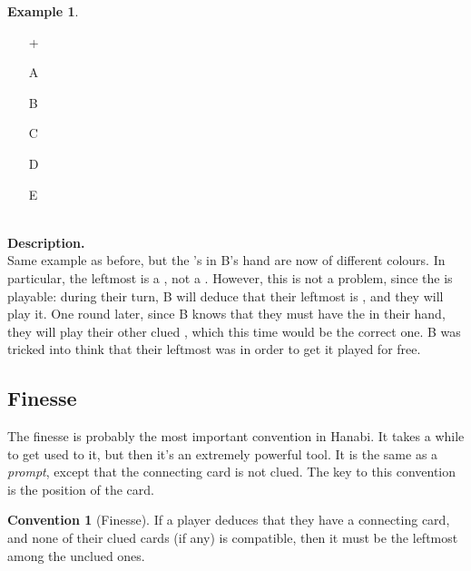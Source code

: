 \documentclass[a4paper]{article}
\theoremstyle{plain}
\theoremstyle{definition}
\newtheorem{example}[theorem]{Example}
\newtheorem{convention}[theorem]{Convention}
\begin{document}
\begin{example} \hfill \\
	\begin{minipage}{0.45\textwidth}
		\begin{itemize}
			\item[\Large +]      
			\item[\Large A]    
			\item[\Large B]    
			\item[\Large C]    
			\item[\Large D]    
			\item[\Large E]    
		\end{itemize}
	\end{minipage}%
	\begin{minipage}{0.55\textwidth}
		\hfill \\
		
		\textbf{Description.} \\
		
		Same example as before, but the 's in B's hand are now of different colours. In particular, the leftmost is a , not a . However, this is not a problem, since the  is playable: during their turn, B will deduce that their leftmost  is , and they will play it. One round later, since B knows that they must have the  in their hand, they will play their other clued , which this time would be the correct one. B was tricked into think that their leftmost  was  in order to get it played for free.
	\end{minipage}
\end{example} \vspace{0.15 cm}

\subsection{Finesse}
\label{sec:finesse}

The finesse is probably the most important convention in Hanabi. It takes a while to get used to it, but then it's an extremely powerful tool. It is the same as a \emph{prompt}, except that the connecting card is not clued. The key to this convention is the position of the card.

\begin{convention}[Finesse]
	\label{finesse}
	If a player deduces that they have a connecting card, and none of their clued cards (if any) is compatible, then it must be the leftmost among the unclued ones.
\end{convention}
\end{document}

